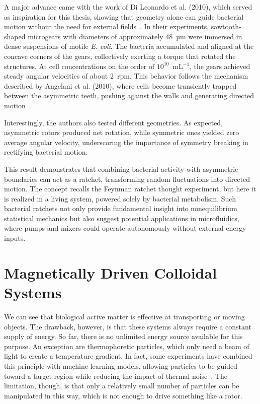 A major advance came with the work of Di Leonardo et al. (2010), which served as inspiration for this thesis, showing that geometry alone can guide bacterial motion without the need for external fields~\cite{di2010bacterial}. In their experiments, sawtooth-shaped microgears with diameters of approximately 48~µm were immersed in dense suspensions of motile \textit{E. coli}. The bacteria accumulated and aligned at the concave corners of the gears, collectively exerting a torque that rotated the structures. At cell concentrations on the order of $10^{10}$~mL$^{-1}$, the gears achieved steady angular velocities of about 2~rpm. This behavior follows the mechanism described by Angelani et al. (2010), where cells become transiently trapped between the asymmetric teeth, pushing against the walls and generating directed motion~\cite{angelani2010geometrically}. 

Interestingly, the authors also tested different geometries. As expected, asymmetric rotors produced net rotation, while symmetric ones yielded zero average angular velocity, underscoring the importance of symmetry breaking in rectifying bacterial motion. 

This result demonstrates that combining bacterial activity with asymmetric boundaries can act as a ratchet, transforming random fluctuations into directed motion. The concept recalls the Feynman ratchet thought experiment, but here it is realized in a living system, powered solely by bacterial metabolism. Such bacterial ratchets not only provide fundamental insight into nonequilibrium statistical mechanics but also suggest potential applications in microfluidics, where pumps and mixers could operate autonomously without external energy inputs.

\chapter{Magnetically Driven Colloidal Systems}
\label{magneticallydrivencolloidalsystems}


We can see that biological active matter is effective at transporting or moving objects. The drawback, however, is that these systems always require a constant supply of energy. So far, there is no unlimited energy source available for this purpose. An exception are thermophoretic particles, which only need a beam of light to create a temperature gradient. In fact, some experiments have combined this principle with machine learning models, allowing particles to be guided toward a target region while reducing the impact of thermal noise~\cite{muinos2021reinforcement}. The limitation, though, is that only a relatively small number of particles can be manipulated in this way, which is not enough to drive something like a rotor.

